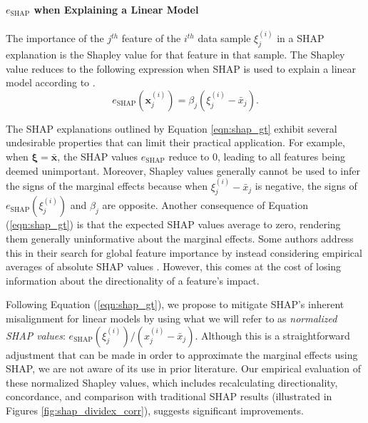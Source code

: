 \documentclass[mnsc,blindrev]{informs3}
\begin{document}
         \paragraph{$e_{\text{SHAP}}$ when Explaining a Linear Model}
              The importance of the $j^{th}$ feature of the $i^{th}$ data sample $\xi^{(i)}_j$ in a SHAP explanation is the Shapley value for that feature in that sample. The Shapley value reduces to the following expression when SHAP is used to explain a linear model according to \cite{StrumbeljErik2014Epma,lundberg17shap}. 
             \begin{equation}
                \label{eqn:shap_gt}
                e_\text{SHAP}(\mathbf{x}^{(i)}_j) = \beta_j (\xi^{(i)}_j - \bar{x}_j).
             \end{equation}

            
The SHAP explanations outlined by Equation \ref{eqn:shap_gt} exhibit several undesirable properties that can limit their practical application. For example, when $\boldsymbol{\xi}=\bar{\mathbf{x}}$, the SHAP values $e_\text{SHAP}$ reduce to 0, leading to all features being deemed unimportant. Moreover, Shapley values generally cannot be used to infer the signs of the marginal effects because when $\xi^{(i)}_j - \bar{x}_j$ is negative, the signs of $e_{\text{SHAP}}(\xi^{(i)}_j)$ and $\beta_j$ are opposite. Another consequence of Equation (\ref{eqn:shap_gt})  is that the expected SHAP values average to zero, rendering them generally uninformative about the marginal effects. Some authors address this in their search for global feature importance by instead considering empirical averages of absolute SHAP values \citep{lenaers23rent,maeng23vr,guenther2023useful}. However, this comes at the cost of losing information about the directionality of a feature's impact.

             Following Equation (\ref{eqn:shap_gt}), we propose to mitigate SHAP's inherent misalignment for linear models by using what we will refer to as \emph{normalized SHAP values}: $e_{\text{SHAP}}(\xi^{(i)}_j) / (x^{(i)}_j - \bar{x}_j)$. Although this is a straightforward adjustment that can be made in order to approximate the marginal effects using SHAP, we are not aware of its use in prior literature.  Our empirical evaluation of these normalized Shapley values, which includes recalculating directionality, concordance, and comparison with traditional SHAP results (illustrated in Figures \ref{fig:shap_dividex_corr}), suggests significant improvements.
             
\end{document}
